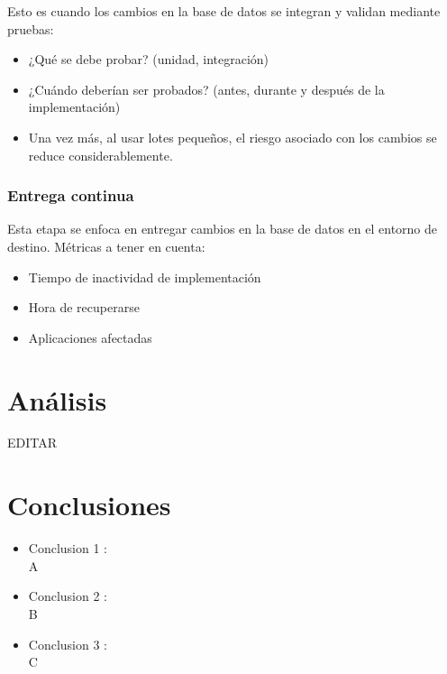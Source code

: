 \documentclass[preprint,12pt]{elsarticle}
\begin{document}
Esto es cuando los cambios en la base de datos se integran y validan mediante pruebas:
\begin{itemize}
\item ¿Qué se debe probar? (unidad, integración)
\item ¿Cuándo deberían ser probados? (antes, durante y después de la implementación)
\item Una vez más, al usar lotes pequeños, el riesgo asociado con los cambios se reduce considerablemente.
\end{itemize}


\subsubsection{\textbf{Entrega continua}}

Esta etapa se enfoca en entregar cambios en la base de datos en el entorno de destino. Métricas a tener en cuenta:
\begin{itemize}
\item Tiempo de inactividad de implementación
\item Hora de recuperarse
\item Aplicaciones afectadas
\end{itemize}



\section{Análisis}

EDITAR




\section{Conclusiones}

\begin{itemize}

\item Conclusion 1 : \\ A

\item Conclusion 2 : \\ B

\item Conclusion 3 : \\ C

\end{itemize}
\end{document}

